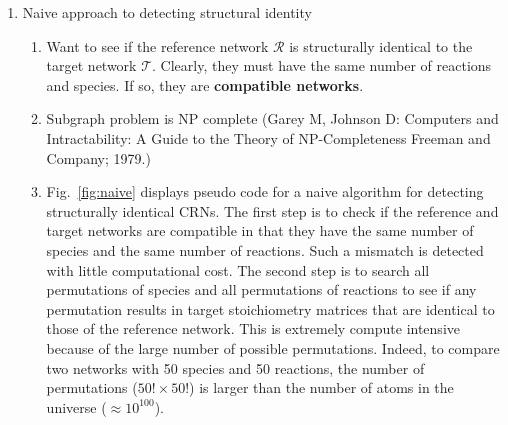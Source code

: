 \documentclass{article}
\newcommand{\fig}[1]{Fig.~\ref{#1}}
\begin{document}
\begin{enumerate}
    \item Naive approach to detecting structural identity
    \begin{enumerate}
        \item Want to see if the reference network ${\mathcal{R}}$ is structurally identical to the target network ${\mathcal{T}}$. Clearly, they must have the same number of reactions and species. If so, they are {\bf compatible networks}.

        \item Subgraph problem is NP complete (Garey M, Johnson D: Computers and Intractability: A Guide to the Theory of NP-Completeness Freeman and Company; 1979.)
    
        
        \item \fig{fig:naive} displays pseudo code for a naive algorithm for detecting structurally identical CRNs. The first step is to check if the reference and target networks are compatible in that they have the same number of species and the same number of reactions. Such a mismatch is detected with little computational cost. The second step is to search all permutations of species and all permutations of reactions to see if any permutation results in target stoichiometry matrices that are identical to those of the reference network. This is extremely compute intensive because of the large number of possible permutations. Indeed, to compare two networks with 50 species and 50 reactions, the number of permutations  ($50!\times 50!$) is larger than the number of atoms in the universe ($\approx 10^{100}$).
    \end{enumerate}
    

\end{enumerate}
\end{document}

